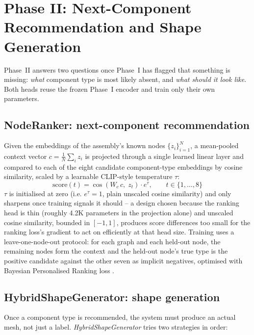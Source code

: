 \documentclass[sn-mathphys,Numbered]{sn-jnl}
\begin{document}
\section{Phase II: Next-Component Recommendation and Shape Generation}\label{sec:phase2}

Phase~II answers two questions once Phase~I has flagged that something is missing: \emph{what} component type is most likely absent, and \emph{what should it look like}. Both heads reuse the frozen Phase~I encoder and train only their own parameters.

\subsection{NodeRanker: next-component recommendation}\label{sec:noderanker}

Given the embeddings of the assembly's known nodes $\{z_i\}_{i=1}^{N}$, a mean-pooled context vector $c = \frac{1}{N}\sum_i z_i$ is projected through a single learned linear layer and compared to each of the eight candidate component-type embeddings by cosine similarity, scaled by a learnable CLIP-style temperature $\tau$:
\begin{equation}
\text{score}(t) = \cos\!\left(W_c\, c,\; z_t\right) \cdot e^{\tau}, \qquad t \in \{1,\dots,8\}
\label{eq:rankerscore}
\end{equation}
$\tau$ is initialised at zero (i.e. $e^{\tau}=1$, plain unscaled cosine similarity) and only sharpens once training signals it should -- a design chosen because the ranking head is thin (roughly 4.2K parameters in the projection alone) and unscaled cosine similarity, bounded in $[-1,1]$, produces score differences too small for the ranking loss's gradient to act on efficiently at that head size. Training uses a leave-one-node-out protocol: for each graph and each held-out node, the remaining nodes form the context and the held-out node's true type is the positive candidate against the other seven as implicit negatives, optimised with Bayesian Personalised Ranking loss \cite{rendle2009bpr}.

\subsection{HybridShapeGenerator: shape generation}\label{sec:shapegen}

Once a component type is recommended, the system must produce an actual mesh, not just a label. \textit{HybridShapeGenerator} tries two strategies in order:
\end{document}
